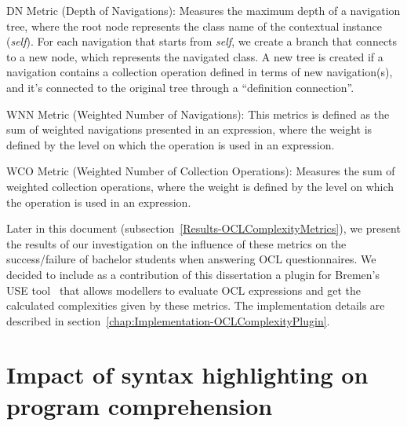 \begin{definition}\label{def:DN}
DN Metric (Depth of Navigations): Measures the maximum depth of a navigation tree, where the root node represents the class name of the contextual instance (\textit{self}). For each navigation that starts from \textit{self}, we create a branch that connects to a new node, which represents the navigated class. A new tree is created if a navigation contains a collection operation defined in terms of new navigation(s), and it's connected to the original tree through a “definition connection”.
\end{definition}

\begin{definition}\label{def:WNN}
WNN Metric (Weighted Number of Navigations):  This metrics is defined as the sum of weighted navigations presented in an expression, where the weight is defined by the level on which the operation is used in an expression.
\end{definition}

\begin{definition}\label{def:WCO}
WCO Metric (Weighted Number of Collection Operations): Measures the sum of weighted collection operations, where the weight is defined by the level on which the operation is used in an expression.
\end{definition}

Later in this document (subsection~\ref{Results-OCLComplexityMetrics}), we present the results of our investigation on the influence of these metrics on the success/failure of bachelor students when answering OCL questionnaires. We decided to include as a contribution of this dissertation a plugin for Bremen's USE tool~\cite{use} that allows modellers to evaluate OCL expressions and get the calculated complexities given by these metrics. The implementation details are described in section~\ref{chap:Implementation-OCLComplexityPlugin}.

\section{Impact of syntax highlighting on program comprehension}
\label{sec:RelatedWork-SyntaxHighlight}

